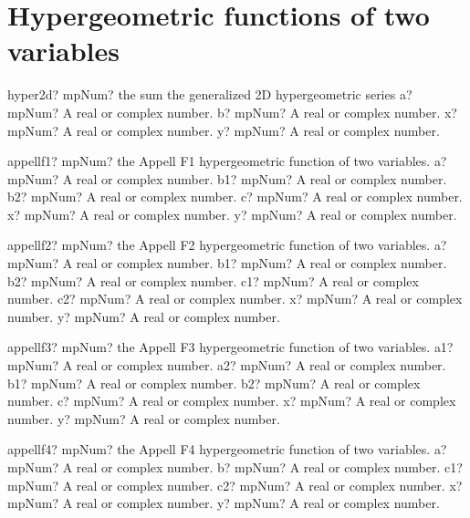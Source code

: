 \documentclass[12pt,a4paper,openany]{book}
\begin{document}
\section{Hypergeometric functions of two variables}

\begin{mpFunctionsExtract}
\mpFunctionFour
{hyper2d? mpNum? the sum the generalized 2D hypergeometric series}
{a? mpNum? A real or complex number.}
{b? mpNum? A real or complex number.}
{x? mpNum? A real or complex number.}
{y? mpNum? A real or complex number.}
\end{mpFunctionsExtract}

\begin{mpFunctionsExtract}
\mpFunctionSix
{appellf1? mpNum? the Appell F1 hypergeometric function of two variables.}
{a? mpNum? A real or complex number.}
{b1? mpNum? A real or complex number.}
{b2? mpNum? A real or complex number.}
{c? mpNum? A real or complex number.}
{x? mpNum? A real or complex number.}
{y? mpNum? A real or complex number.}
\end{mpFunctionsExtract}

\begin{mpFunctionsExtract}
\mpFunctionSeven
{appellf2? mpNum? the Appell F2 hypergeometric function of two variables.}
{a? mpNum? A real or complex number.}
{b1? mpNum? A real or complex number.}
{b2? mpNum? A real or complex number.}
{c1? mpNum? A real or complex number.}
{c2? mpNum? A real or complex number.}
{x? mpNum? A real or complex number.}
{y? mpNum? A real or complex number.}
\end{mpFunctionsExtract}

\begin{mpFunctionsExtract}
\mpFunctionSeven
{appellf3? mpNum? the Appell F3 hypergeometric function of two variables.}
{a1? mpNum? A real or complex number.}
{a2? mpNum? A real or complex number.}
{b1? mpNum? A real or complex number.}
{b2? mpNum? A real or complex number.}
{c? mpNum? A real or complex number.}
{x? mpNum? A real or complex number.}
{y? mpNum? A real or complex number.}
\end{mpFunctionsExtract}

\begin{mpFunctionsExtract}
\mpFunctionSix
{appellf4? mpNum? the Appell F4 hypergeometric function of two variables.}
{a? mpNum? A real or complex number.}
{b? mpNum? A real or complex number.}
{c1? mpNum? A real or complex number.}
{c2? mpNum? A real or complex number.}
{x? mpNum? A real or complex number.}
{y? mpNum? A real or complex number.}
\end{mpFunctionsExtract}
\end{document}
